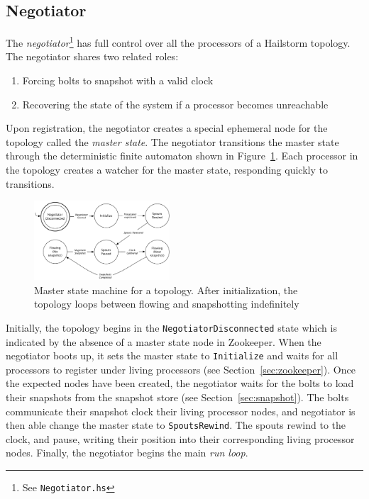 \documentclass[10pt,nocopyrightspace]{sigplanconf}
\begin{document}
\subsection{Negotiator}
\label{sec:negotiator}

The \textit{negotiator}\footnote{See \texttt{Negotiator.hs}} has full control
over all the processors of a Hailstorm topology. The negotiator shares
two related roles:
\begin{enumerate}
  \item Forcing bolts to snapshot with a valid clock
  \item Recovering the state of the system if a processor
        becomes unreachable
\end{enumerate}

Upon registration, the negotiator creates a special ephemeral node for the
topology called the \textit{master state}. The negotiator transitions the master
state through the deterministic finite automaton shown in
Figure~\ref{fig:masterstate}. Each processor in the topology creates a
watcher for the master state, responding quickly to transitions.

\begin{figure}[h]
  \includegraphics[width=0.45\textwidth]{images/master_state.pdf}
  \caption{Master state machine for a topology. After initialization, the
  topology loops between flowing and snapshotting
  indefinitely}\label{fig:masterstate}
\end{figure}

Initially, the topology begins in the \lstinline{NegotiatorDisconnected} state which
is indicated by the absence of a master state node in Zookeeper. When the
negotiator boots up, it sets the master state to \lstinline{Initialize} and waits
for all processors to register under living processors (see
Section~\ref{sec:zookeeper}). Once the expected nodes have been created, the
negotiator waits for the bolts to load their snapshots from the snapshot store
(see Section~\ref{sec:snapshot}). The bolts communicate their snapshot clock
their living processor nodes, and negotiator is then able change the master state to
\lstinline{SpoutsRewind}. The spouts rewind to the clock, and pause, writing their
position into their corresponding living processor nodes. Finally, the
negotiator begins the main \textit{run loop}.
\end{document}
